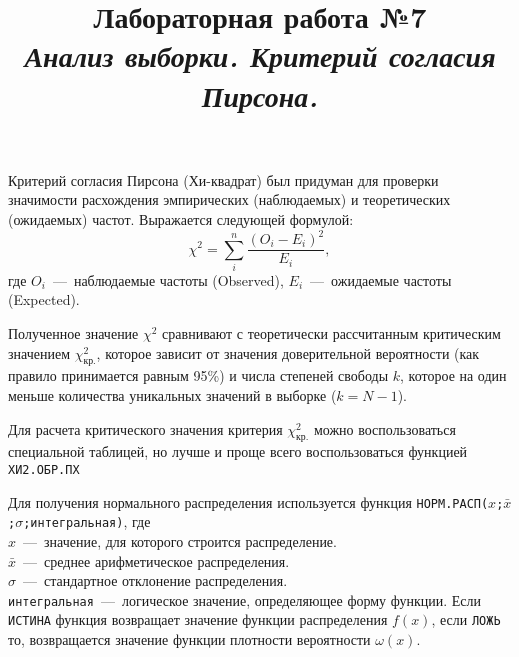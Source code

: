 \documentclass[14pt,a4paper]{article}
\title{Лабораторная работа №7 \\ \textit{Анализ выборки. Критерий согласия Пирсона.}}
\begin{document}
\maketitle
Критерий согласия Пирсона (Хи-квадрат) был придуман для проверки значимости расхождения эмпирических (наблюдаемых) и теоретических (ожидаемых) частот. Выражается следующей формулой:
\begin{equation} \label{PoissonDistrib}
    \chi^2 = \sum\limits_i^n \frac{(O_i - E_i)^2}{E_i},
\end{equation}
где $O_i$~---~наблюдаемые частоты (Observed), $E_i$~---~ожидаемые частоты (Expected). 

Полученное значение $\chi^2$ сравнивают с теоретически рассчитанным критическим значением $\chi^2_\text{кр.}$, которое зависит от значения доверительной вероятности (как правило принимается равным 95\%) и числа степеней свободы $k$, которое на один меньше количества уникальных значений в выборке ($k = N - 1$). 

Для расчета критического значения критерия $\chi^2_\text{кр.}$ можно воспользоваться специальной таблицей, но лучше и проще всего воспользоваться функцией \texttt{ХИ2.ОБР.ПХ}


Для получения нормального распределения используется функция \texttt{НОРМ.РАСП($x$;$\bar{x}$;$\sigma$;интегральная)}, где \\
	$x$~---~значение, для которого строится распределение. \\
    $\bar{x}$~---~среднее арифметическое распределения.\\
    $\sigma$~---~стандартное отклонение распределения.\\
    \texttt{интегральная}~---~логическое значение, определяющее форму функции. Если \texttt{ИСТИНА} функция возвращает значение функции распределения $f(x)$, если \texttt{ЛОЖЬ} то, возвращается значение функции плотности вероятности $\omega(x)$.
\end{document}
